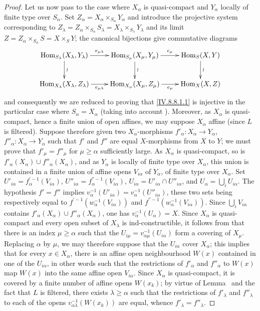 \begin{proof}
Let us now pass to the case where $X_\alpha$ is quasi-compact and $Y_\alpha$ locally of finite type over $S_\alpha$.
Set $Z_\alpha=X_\alpha\times_{S_\alpha}Y_\alpha$ and introduce the projective system corresponding to $Z_\lambda=Z_\alpha\times_{S_\alpha}S_\lambda=X_\lambda\times_{S_\lambda}Y_\lambda$ and its limit $Z=Z_\alpha\times_{S_\alpha}S=X\times_S Y$; the canonical bijections  give commutative diagrams
\[
\xymatrix{
  \operatorname{Hom}_{S_\lambda}(X_\lambda,Y_\lambda) \ar[r]^-{e_{\mu\lambda}} \ar[d]^{\wr} & \operatorname{Hom}_{S_\mu}(X_\mu,Y_\mu) \ar[r]^-{e_\mu} \ar[d]^{\wr} & \operatorname{Hom}_S(X,Y) \ar[d]^{\wr}\\
  \operatorname{Hom}_{X_\lambda}(X_\lambda,Z_\lambda) \ar[r]_-{e_{\mu\lambda}} & \operatorname{Hom}_{X_\mu}(X_\mu,Z_\mu) \ar[r]_-{e_\mu} & \operatorname{Hom}_X(X,Z)
}
\]
and consequently we are reduced to proving that \eqref{IV.8.8.1.1} is injective in the particular case where $S_\alpha=X_\alpha$ (taking into account ).
Moreover, as $X_\alpha$ is quasi-compact, hence a finite union of open affines, we may suppose $X_\alpha$ affine (since $L$ is filtered). Suppose therefore given two $X_\alpha$-morphisms $f'_\alpha:X_\alpha\to Y_\alpha$, $f''_\alpha:X_\alpha\to Y_\alpha$ such that $f'$ and $f''$ are equal $X$-morphisms from $X$ to $Y$; we must prove that $f'_\mu=f''_\mu$ for $\mu\geqslant\alpha$ sufficiently large. As $X_\alpha$ is quasi-compact, so is $f'_\alpha(X_\alpha)\cup f''_\alpha(X_\alpha)$, and as $Y_\alpha$ is locally of finite type over $X_\alpha$, this union is contained in a finite union of affine opens $V_{i\alpha}$ of $Y_\alpha$, of finite type over $X_\alpha$. Set $U'_{i\alpha}=f_\alpha^{'-1}(V_{i\alpha})$, $U''_{i\alpha}=f_\alpha^{''-1}(V_{i\alpha})$, $U_{i\alpha}=U'_{i\alpha}\cap U''_{i\alpha}$, and $U_\alpha=\bigcup_iU_{i\alpha}$. The hypothesis $f'=f''$ implies $v_\alpha^{-1}(U'_{i\alpha})=v_\alpha^{-1}(U''_{i\alpha})$, these two sets being respectively equal to $f^{'-1}(w_\alpha^{-1}(V_{i\alpha}))$ and $f^{''-1}(w_\alpha^{-1}(V_{i\alpha}))$. Since $\bigcup_i V_{i\alpha}$ contains $f'_\alpha(X_\alpha)\cup f''_\alpha(X_\alpha)$, one has $v_\alpha^{-1}(U_\alpha)=X$. Since $X_\alpha$ is quasi-compact and every open subset of $X_\lambda$ is ind-constructible, it follows from  that there is an index $\mu\geqslant\alpha$ such that the $U_{i\mu}=v_{\alpha\mu}^{-1}(U_{i\alpha})$ form a covering of $X_\mu$. Replacing $\alpha$ by $\mu$, we may therefore suppose that the $U_{i\alpha}$ cover $X_\alpha$; this implies that for every $x\in X_\alpha$, there is an affine open neighbourhood $W(x)$ contained in one of the $U_{i\alpha}$, in other words such that the restrictions of $f'_\alpha$ and $f''_\alpha$ to $W(x)$ map $W(x)$ into the same affine open $V_{i\alpha}$. Since $X_\alpha$ is quasi-compact, it is covered by a finite number of affine opens $W(x_k)$; by virtue of Lemma~ and the fact that $L$ is filtered, there exists $\lambda\geqslant\alpha$ such that the restrictions of $f'_\lambda$ and $f''_\lambda$ to each of the opens $v_{\alpha\lambda}^{-1}(W(x_k))$ are equal, whence $f'_\lambda=f''_\lambda$.


\end{proof}
